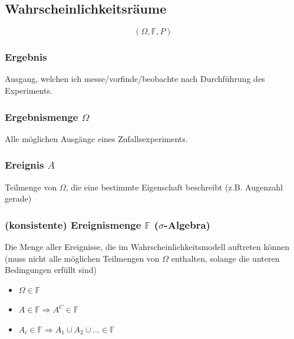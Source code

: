 \subsection{Wahrscheinlichkeitsräume}

\begin{emphbox}
    \begin{equation*}
        (\Omega, \mathbb F, P)
    \end{equation*}
\end{emphbox}

\begin{sectionbox}
    \subsubsection{Ergebnis}
    Ausgang, welchen ich messe/vorfinde/beobachte nach Durchführung des Experiments.

    \subsubsection{Ergebnismenge $\Omega$}
    Alle möglichen Ausgänge eines Zufallsexperiments.
\end{sectionbox}

\begin{sectionbox}
    \subsubsection{Ereignis $A$}
    Teilmenge von $\Omega$, die eine bestimmte Eigenschaft beschreibt (z.B. Augenzahl gerade)

    \subsubsection{(konsistente) Ereignismenge $\mathbb F$ ($\sigma$-Algebra)}
    Die Menge aller Ereignisse, die im Wahrscheinlichkeitsmodell auftreten können (muss nicht alle möglichen Teilmengen von $\Omega$ enthalten, solange die unteren Bedingungen erfüllt sind)
    \begin{itemize}
        \item $\Omega \in \mathbb F$
        \item $A \in \mathbb F \Rightarrow A^C \in \mathbb F$
        \item $A_i\in\mathbb F \Rightarrow A_1\cup A_2 \cup ... \in \mathbb F$
    \end{itemize}

\end{sectionbox}

